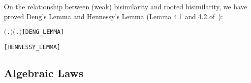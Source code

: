 On the relationship between (weak) bisimilarity and rooted bisimilarity, 
we have proved Deng's Lemma and Hennessy's Lemma
(Lemma 4.1 and 4.2 of~\citep[p.~176,~178]{Gorrieri:2015jt}):
\begin{alltt}
\HOLTokenTurnstile{}  \HOLSymConst{\HOLTokenWeakEQ}  \HOLSymConst{\HOLTokenImp{}} \ensuremath{(}\HOLSymConst{\HOLTokenExists{}}.  \HOLTokenTransBegin\HOLSymConst{\ensuremath{\tau}}\HOLTokenTransEnd {} \HOLSymConst{\HOLTokenConj{}}  \HOLSymConst{\HOLTokenWeakEQ} \ensuremath{)} \HOLSymConst{\HOLTokenDisj{}} \ensuremath{(}\HOLSymConst{\HOLTokenExists{}}.  \HOLTokenTransBegin\HOLSymConst{\ensuremath{\tau}}\HOLTokenTransEnd {} \HOLSymConst{\HOLTokenConj{}}  \HOLSymConst{\HOLTokenWeakEQ} \ensuremath{)} \HOLSymConst{\HOLTokenDisj{}}  \HOLSymConst{\HOLTokenObsCongr} \hfill{[DENG_LEMMA]}
  
\HOLTokenTurnstile{}  \HOLSymConst{\HOLTokenWeakEQ}  \HOLSymConst{\HOLTokenEquiv{}}  \HOLSymConst{\HOLTokenObsCongr}  \HOLSymConst{\HOLTokenDisj{}}  \HOLSymConst{\HOLTokenObsCongr} \HOLSymConst{\ensuremath{\tau}}\HOLSymConst{\ensuremath{\ldotp}} \HOLSymConst{\HOLTokenDisj{}} \HOLSymConst{\ensuremath{\tau}}\HOLSymConst{\ensuremath{\ldotp}} \HOLSymConst{\HOLTokenObsCongr} \hfill{[HENNESSY_LEMMA]}
\end{alltt}

\subsection{Algebraic Laws}
\label{ss:alaws}

